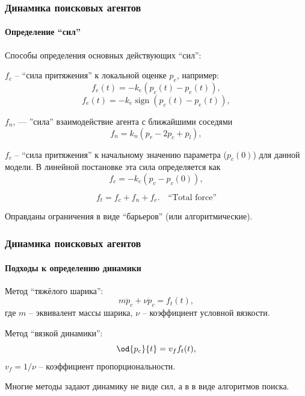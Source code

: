 \documentclass[10pt,utf8]{beamer}
\DeclareMathOperator*{\sign}{sign}
\begin{document}
\begin{frame}
  \frametitle{Динамика поисковых агентов}
  \framesubtitle{Определение ``сил''}

  Способы определения основных действующих ``сил'':

$f_e$ -- ``сила притяжения'' к локальной оценке $p_e$, например:
%
\begin{equation}
  f_e(t) = - k_e ( p_c(t) - p_e(t) ) ,
  \label{atu:eq:f_e_lin}
\end{equation}
%
\begin{equation}
  f_e(t) = - k_e \sign( p_c(t) - p_e(t) ) ,
  \label{atu:eq:f_e_sign}
\end{equation}

$f_n$, --- ''сила'' взаимодействие агента с ближайшими соседями
%
\begin{equation}
  f_n = k_n ( p_r - 2 p_c + p_l ),
  \label{atu:eq:f_n_lin}
\end{equation}

  $f_c$  -- ``сила притяжения'' к начальному значению
  параметра ($p_{c}(0)$)
  для данной модели. В линейной постановке эта сила определяется как
  \begin{equation}
    f_c = -k_c (p_c - p_{c}(0)) ,
    \label{atu:eq:f_c}
  \end{equation}


  \begin{equation}
    f_t = f_c + f_n + f_e . \quad \text{``Total force''}
    \label{atu:eq:f_t}
  \end{equation}

  Оправданы ограничения в виде ``барьеров'' (или алгоритмические).

\end{frame}



\begin{frame}
  \frametitle{Динамика поисковых агентов}
  \framesubtitle{Подходы к определению динамики}

Метод ``тяжёлого шарика'':
%
\begin{equation}
  m \ddot{p}_c + \nu \dot{p}_c = f_t(t),
  \label{atu:eq:heavy_ball}
\end{equation}
%
где $m$ -- эквивалент массы шарика,
$\nu$ -- коэффициент условной вязкости.

Метод ``вязкой динамики'':
%
  \begin{equation}
  \od{p_c}{t} = v_f f_t(t),
  \label{atu:eq:v_f}
\end{equation}
%
\noindent
$v_f = 1/\nu$ -- коэффициент пропорциональности.

\smallskip

Многие методы задают динамику не виде сил,
а в в виде алгоритмов поиска.


\end{frame}
\end{document}
